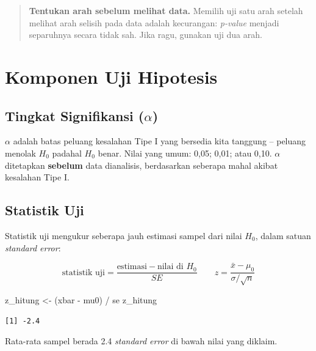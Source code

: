 \documentclass[
  indonesian,
  letterpaper,
]{book}
\newenvironment{Shaded}{\begin{snugshade}}{\end{snugshade}}
\newcommand{\NormalTok}[1]{\textcolor[rgb]{0.00,0.23,0.31}{#1}}
\newcommand{\OtherTok}[1]{\textcolor[rgb]{0.00,0.23,0.31}{#1}}
\newcommand{\SpecialCharTok}[1]{\textcolor[rgb]{0.37,0.37,0.37}{#1}}
\begin{document}
\begin{quote}
\textbf{Tentukan arah sebelum melihat data.} Memilih uji satu arah
setelah melihat arah selisih pada data adalah kecurangan: \emph{p-value}
menjadi separuhnya secara tidak sah. Jika ragu, gunakan uji dua arah.
\end{quote}


\chapter{Komponen Uji Hipotesis}\label{komponen-uji-hipotesis}

\section{\texorpdfstring{Tingkat Signifikansi
(\(\alpha\))}{Tingkat Signifikansi (\textbackslash alpha)}}\label{tingkat-signifikansi-alpha}

\(\alpha\) adalah batas peluang kesalahan Tipe I yang bersedia kita
tanggung -- peluang menolak \(H_0\) padahal \(H_0\) benar. Nilai yang
umum: 0,05; 0,01; atau 0,10. \(\alpha\) ditetapkan \textbf{sebelum} data
dianalisis, berdasarkan seberapa mahal akibat kesalahan Tipe I.

\section{Statistik Uji}\label{statistik-uji}

Statistik uji mengukur seberapa jauh estimasi sampel dari nilai \(H_0\),
dalam satuan \emph{standard error}:

\[\text{statistik uji} = \frac{\text{estimasi} - \text{nilai di } H_0}{SE} \qquad z = \frac{\bar{x} - \mu_0}{\sigma/\sqrt{n}}\]

\begin{Shaded}
\begin{Highlighting}[]
\NormalTok{z\_hitung }\OtherTok{\textless{}{-}}\NormalTok{ (xbar }\SpecialCharTok{{-}}\NormalTok{ mu0) }\SpecialCharTok{/}\NormalTok{ se}
\NormalTok{z\_hitung}
\end{Highlighting}
\end{Shaded}

\begin{verbatim}
[1] -2.4
\end{verbatim}

Rata-rata sampel berada 2.4 \emph{standard error} di bawah nilai yang
diklaim.
\end{document}
